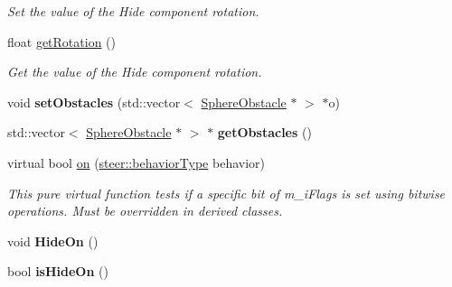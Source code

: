 \begin{DoxyCompactItemize}
\begin{DoxyCompactList}\small\item\em Set the value of the Hide component rotation. \end{DoxyCompactList}\item 
\hypertarget{classsteer_1_1_hide_component_a84d3f4f40129e9e5c1a323c17c2c60fe}{float \hyperlink{classsteer_1_1_hide_component_a84d3f4f40129e9e5c1a323c17c2c60fe}{get\-Rotation} ()}\label{classsteer_1_1_hide_component_a84d3f4f40129e9e5c1a323c17c2c60fe}

\begin{DoxyCompactList}\small\item\em Get the value of the Hide component rotation. \end{DoxyCompactList}\item 
\hypertarget{classsteer_1_1_hide_component_a8342f0fcf4a3f1338c5d7db797fc70f0}{void {\bfseries set\-Obstacles} (std\-::vector$<$ \hyperlink{classsteer_1_1_sphere_obstacle}{Sphere\-Obstacle} $\ast$ $>$ $\ast$o)}\label{classsteer_1_1_hide_component_a8342f0fcf4a3f1338c5d7db797fc70f0}

\item 
\hypertarget{classsteer_1_1_hide_component_ab1e6b2bfaec26bee0c81f3d316ab553d}{std\-::vector$<$ \hyperlink{classsteer_1_1_sphere_obstacle}{Sphere\-Obstacle} $\ast$ $>$ $\ast$ {\bfseries get\-Obstacles} ()}\label{classsteer_1_1_hide_component_ab1e6b2bfaec26bee0c81f3d316ab553d}

\item 
virtual bool \hyperlink{classsteer_1_1_hide_component_a64ff14630f96232381dd0fd88c1d9d04}{on} (\hyperlink{namespacesteer_afe6e72f8f8088962727051501181acbe}{steer\-::behavior\-Type} behavior)
\begin{DoxyCompactList}\small\item\em This pure virtual function tests if a specific bit of m\-\_\-i\-Flags is set using bitwise operations. Must be overridden in derived classes. \end{DoxyCompactList}\item 
\hypertarget{classsteer_1_1_hide_component_ae6cec58fe6b94fe43c9b8e434af1b7f7}{void {\bfseries Hide\-On} ()}\label{classsteer_1_1_hide_component_ae6cec58fe6b94fe43c9b8e434af1b7f7}

\item 
\hypertarget{classsteer_1_1_hide_component_afb4a0954264f650cc48d0acb500c8ff8}{bool {\bfseries is\-Hide\-On} ()}\label{classsteer_1_1_hide_component_afb4a0954264f650cc48d0acb500c8ff8}


\end{DoxyCompactItemize}
